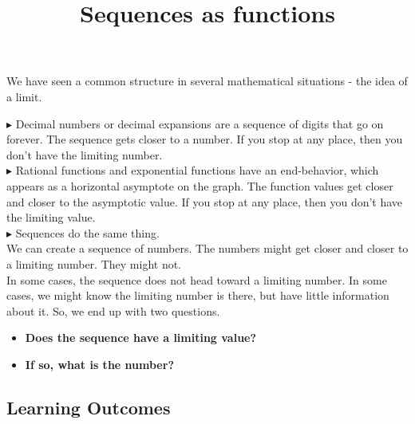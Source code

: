 \documentclass{ximera}
\title{Sequences as functions}
\begin{document}
\begin{abstract}
\end{abstract}

\maketitle




We have seen a common structure in several mathematical situations - the idea of a limit.


\textbf{\textcolor{blue!75!black}{$\blacktriangleright$}}  Decimal numbers or decimal expansions are a sequence of digits that go on forever.  The sequence gets closer to a number. If you stop at any place, then you don't have the limiting number. \\


\textbf{\textcolor{blue!75!black}{$\blacktriangleright$}} Rational functions and exponential functions have an end-behavior, which appears as a horizontal asymptote on the graph.  The function values get closer and closer to the asymptotic value.  If you stop at any place, then you don't have the limiting value. \\


\textbf{\textcolor{blue!75!black}{$\blacktriangleright$}} Sequences do the same thing. \\


We can create a sequence of numbers. The numbers might get closer and closer to a limiting number.  They might not. \\




In some cases, the sequence does not head toward a limiting number. In some cases, we might know the limiting number is there, but have little information about it.  So, we end up with two questions.



\begin{itemize}
\item \textbf{\textcolor{purple!85!blue}{Does the sequence have a limiting value?}} 
\item \textbf{\textcolor{purple!85!blue}{If so, what is the number?}} 
\end{itemize}









\subsection{Learning Outcomes}
\end{document}
